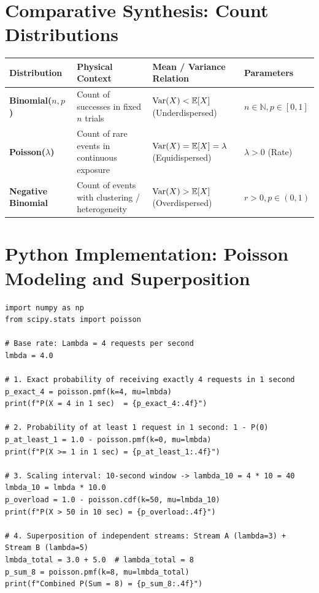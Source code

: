 \section{Comparative Synthesis: Count Distributions}

\begin{center}
\renewcommand{\arraystretch}{1.3}
\begin{tabular}{p{3.2cm}p{3.8cm}p{3.5cm}p{3.8cm}}
\toprule
\textbf{Distribution} & \textbf{Physical Context} & \textbf{Mean / Variance Relation} & \textbf{Parameters} \\
\midrule
\textbf{Binomial($n, p$)} & Count of successes in fixed $n$ trials & $\operatorname{Var}(X) < \mathbb{E}[X]$ (Underdispersed) & $n \in \mathbb{N}, p \in [0, 1]$ \\
\textbf{Poisson($\lambda$)} & Count of rare events in continuous exposure & $\operatorname{Var}(X) = \mathbb{E}[X] = \lambda$ (Equidispersed) & $\lambda > 0$ (Rate) \\
\textbf{Negative Binomial} & Count of events with clustering / heterogeneity & $\operatorname{Var}(X) > \mathbb{E}[X]$ (Overdispersed) & $r > 0, p \in (0, 1)$ \\
\bottomrule
\end{tabular}
\end{center}

\section{Python Implementation: Poisson Modeling and Superposition}

\begin{lstlisting}[caption={Poisson PMF, Cumulative Distribution, and Superposition in SciPy}]
import numpy as np
from scipy.stats import poisson

# Base rate: Lambda = 4 requests per second
lmbda = 4.0

# 1. Exact probability of receiving exactly 4 requests in 1 second
p_exact_4 = poisson.pmf(k=4, mu=lmbda)
print(f"P(X = 4 in 1 sec)  = {p_exact_4:.4f}")

# 2. Probability of at least 1 request in 1 second: 1 - P(0)
p_at_least_1 = 1.0 - poisson.pmf(k=0, mu=lmbda)
print(f"P(X >= 1 in 1 sec) = {p_at_least_1:.4f}")

# 3. Scaling interval: 10-second window -> lambda_10 = 4 * 10 = 40
lmbda_10 = lmbda * 10.0
p_overload = 1.0 - poisson.cdf(k=50, mu=lmbda_10)
print(f"P(X > 50 in 10 sec) = {p_overload:.4f}")

# 4. Superposition of independent streams: Stream A (lambda=3) + Stream B (lambda=5)
lmbda_total = 3.0 + 5.0  # lambda_total = 8
p_sum_8 = poisson.pmf(k=8, mu=lmbda_total)
print(f"Combined P(Sum = 8) = {p_sum_8:.4f}")
\end{lstlisting}

